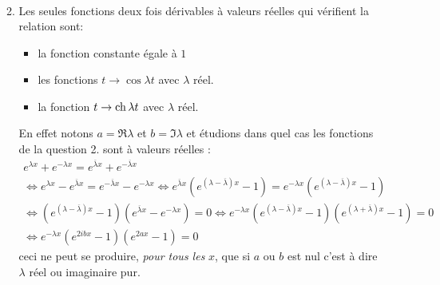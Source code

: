 \begin{enumerate}
\begin{enumerate}
\begin{multline*}
\end{multline*}
\item Les seules fonctions deux fois dérivables à valeurs réelles qui vérifient la relation sont:
\begin{itemize}
 \item la fonction constante égale à $1$
 \item les fonctions $t\rightarrow \cos\lambda t$ avec $\lambda$ réel. 
 \item la fonction $t\rightarrow\operatorname{ch}\lambda t$  avec $\lambda$ réel.
\end{itemize}
En effet notons $a=\Re \lambda$ et $b=\Im \lambda$ et étudions dans quel cas les fonctions de la question 2. sont à valeurs réelles :
\begin{multline*}
 e^{\lambda x}+e^{-\lambda x}=e^{\overline{\lambda} x}+e^{-\overline{\lambda} x} \\
 \Leftrightarrow e^{\lambda x}-e^{\overline{\lambda} x} = e^{-\overline{\lambda} x} - e^{-\lambda x} 
\Leftrightarrow e^{\overline{\lambda} x}\left( e^{(\lambda -\overline{\lambda} ) x}-1\right)  
= e^{-\lambda x}\left( e^{(\lambda-\overline{\lambda}) x} - 1\right) \\
\Leftrightarrow \left( e^{(\lambda -\overline{\lambda} ) x}-1\right)\left( e^{\overline{\lambda} x}-e^{-\lambda x}\right) =0 
\Leftrightarrow e^{-\lambda x}\left( e^{(\lambda -\overline{\lambda} ) x}-1\right)\left( e^{(\lambda+\overline{\lambda}) x}-1\right) =0 \\
\Leftrightarrow e^{-\lambda x}\left( e^{2ib x}-1\right)\left( e^{2a x}-1\right) =0
\end{multline*}
ceci ne peut se produire, \emph{pour tous les } $x$, que si $a$ ou $b$ est nul c'est à dire $\lambda$ réel ou imaginaire pur.
\end{enumerate}
\end{enumerate}